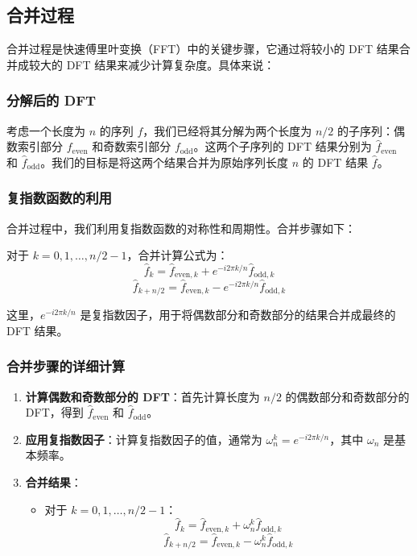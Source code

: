 \documentclass{ctexart}
\begin{document}
\subsection{合并过程}

合并过程是快速傅里叶变换（FFT）中的关键步骤，它通过将较小的 DFT 结果合并成较大的 DFT 结果来减少计算复杂度。具体来说：

\subsubsection{分解后的 DFT}

考虑一个长度为 \( n \) 的序列 \( f \)，我们已经将其分解为两个长度为 \( n/2 \) 的子序列：偶数索引部分 \( f_{\text{even}} \) 和奇数索引部分 \( f_{\text{odd}} \)。这两个子序列的 DFT 结果分别为 \( \hat{f}_{\text{even}} \) 和 \( \hat{f}_{\text{odd}} \)。我们的目标是将这两个结果合并为原始序列长度 \( n \) 的 DFT 结果 \( \hat{f} \)。

\subsubsection{复指数函数的利用}

合并过程中，我们利用复指数函数的对称性和周期性。合并步骤如下：

对于 \( k = 0, 1, \ldots, n/2-1 \)，合并计算公式为：
\[
\hat{f}_k = \hat{f}_{\text{even}, k} + e^{-i2\pi k/n} \hat{f}_{\text{odd}, k}
\]
\[
\hat{f}_{k+n/2} = \hat{f}_{\text{even}, k} - e^{-i2\pi k/n} \hat{f}_{\text{odd}, k}
\]

这里，\( e^{-i2\pi k/n} \) 是复指数因子，用于将偶数部分和奇数部分的结果合并成最终的 DFT 结果。

\subsubsection{合并步骤的详细计算}

\begin{enumerate}
    \item \textbf{计算偶数和奇数部分的 DFT}：首先计算长度为 \( n/2 \) 的偶数部分和奇数部分的 DFT，得到 \( \hat{f}_{\text{even}} \) 和 \( \hat{f}_{\text{odd}} \)。
    
    \item \textbf{应用复指数因子}：计算复指数因子的值，通常为 \( \omega_n^k = e^{-i2\pi k/n} \)，其中 \( \omega_n \) 是基本频率。
    
    \item \textbf{合并结果}：
    \begin{itemize}
        \item 对于 \( k = 0, 1, \ldots, n/2-1 \)：
        \[
        \hat{f}_k = \hat{f}_{\text{even}, k} + \omega_n^k \hat{f}_{\text{odd}, k}
        \]
        \[
        \hat{f}_{k+n/2} = \hat{f}_{\text{even}, k} - \omega_n^k \hat{f}_{\text{odd}, k}
        \]
    \end{itemize}
\end{enumerate}
\end{document}
